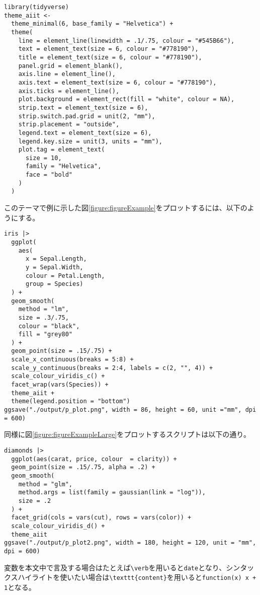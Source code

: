 \documentclass[fontsize=9pt, jafontscale=.95, twocolumn, a4paper]{jlreq}
\begin{document}
\begin{verbatim}
library(tidyverse)
theme_aiit <- 
  theme_minimal(6, base_family = "Helvetica") +
  theme(
    line = element_line(linewidth = .1/.75, colour = "#545B66"),
    text = element_text(size = 6, colour = "#778190"),
    title = element_text(size = 6, colour = "#778190"),
    panel.grid = element_blank(),
    axis.line = element_line(),
    axis.text = element_text(size = 6, colour = "#778190"),
    axis.ticks = element_line(),
    plot.background = element_rect(fill = "white", colour = NA),
    strip.text = element_text(size = 6),
    strip.switch.pad.grid = unit(2, "mm"),
    strip.placement = "outside",
    legend.text = element_text(size = 6),
    legend.key.size = unit(3, units = "mm"),
    plot.tag = element_text(
      size = 10, 
      family = "Helvetica", 
      face = "bold"
    )
  )
\end{verbatim}
このテーマで例に示した図\ref{figure:figureExample}をプロットするには、以下のようにする。
\begin{verbatim}
iris |> 
  ggplot(
    aes(
      x = Sepal.Length, 
      y = Sepal.Width, 
      colour = Petal.Length, 
      group = Species)
  ) +
  geom_smooth(
    method = "lm", 
    size = .3/.75, 
    colour = "black", 
    fill = "grey80"
  ) +
  geom_point(size = .15/.75) +
  scale_x_continuous(breaks = 5:8) +
  scale_y_continuous(breaks = 2:4, labels = c(2, "", 4)) +
  scale_colour_viridis_c() +
  facet_wrap(vars(Species)) +
  theme_aiit +
  theme(legend.position = "bottom")
ggsave("./output/p_plot.png", width = 86, height = 60, unit ="mm", dpi = 600)
\end{verbatim}

同様に図\ref{figure:figureExampleLarge}をプロットするスクリプトは以下の通り。

\begin{verbatim}
diamonds |> 
  ggplot(aes(carat, price, colour  = clarity)) +
  geom_point(size = .15/.75, alpha = .2) +
  geom_smooth(
    method = "glm", 
    method.args = list(family = gaussian(link = "log")),
    size = .2
  ) +
  facet_grid(cols = vars(cut), rows = vars(color)) +
  scale_colour_viridis_d() +
  theme_aiit
ggsave("./output/p_plot2.png", width = 180, height = 120, unit = "mm", dpi = 600)
\end{verbatim}

変数を本文中で言及する場合はたとえば\verb|\verb|を用いると\verb|date|となり、シンタックスハイライトを使いたい場合は\verb|\texttt{content}|を用いると\texttt{function(x) {x + 1}}となる。
\end{document}
